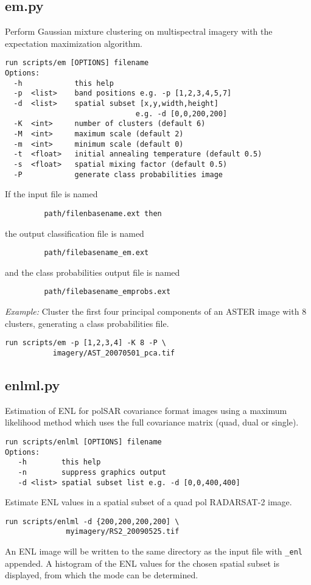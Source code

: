 \documentclass{paper}
\begin{document}
\subsection*{em.py}
Perform Gaussian mixture clustering on multispectral imagery with the expectation maximization algorithm.
\begin{verbatim}
run scripts/em [OPTIONS] filename
Options:
  -h            this help
  -p  <list>    band positions e.g. -p [1,2,3,4,5,7]
  -d  <list>    spatial subset [x,y,width,height]
                              e.g. -d [0,0,200,200]
  -K  <int>     number of clusters (default 6)
  -M  <int>     maximum scale (default 2)
  -m  <int>     minimum scale (default 0)
  -t  <float>   initial annealing temperature (default 0.5)
  -s  <float>   spatial mixing factor (default 0.5)
  -P            generate class probabilities image
\end{verbatim}
If the input file is named
\begin{lstlisting}
         path/filenbasename.ext then
\end{lstlisting}
the output classification file is named
\begin{lstlisting}
         path/filebasename_em.ext
\end{lstlisting}
and the class probabilities output file is named
\begin{lstlisting}
         path/filebasename_emprobs.ext
\end{lstlisting}
{\it Example:} Cluster the first four principal components  of an ASTER image with 8 clusters, generating a class probabilities file.
\begin{lstlisting}
run scripts/em -p [1,2,3,4] -K 8 -P \
           imagery/AST_20070501_pca.tif
\end{lstlisting}



\subsection*{enlml.py}


Estimation of ENL for polSAR covariance format images
using a maximum likelihood method which uses the full covariance matrix (quad, dual or single).
\begin{verbatim}
run scripts/enlml [OPTIONS] filename
Options:
   -h        this help
   -n        suppress graphics output
   -d <list> spatial subset list e.g. -d [0,0,400,400]
\end{verbatim}
  Estimate ENL values in a  spatial subset of a quad pol RADARSAT-2 image.
\begin{lstlisting}
run scripts/enlml -d {200,200,200,200] \
              myimagery/RS2_20090525.tif
\end{lstlisting}
An ENL image will be written to the same directory as the input file with {\tt \_enl} appended. A histogram of the ENL values for the chosen spatial subset is displayed, from which the mode can be determined.
\end{document}
